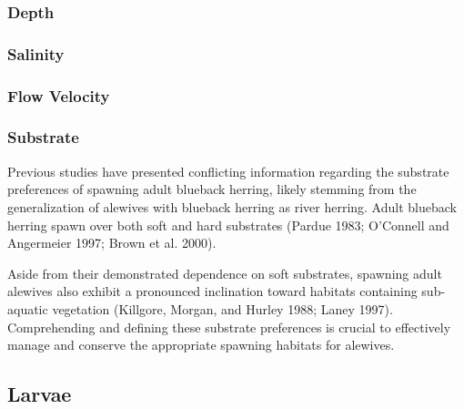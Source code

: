 \documentclass[
]{book}
\begin{document}
\hypertarget{depth-10}{%
\subsubsection{Depth}\label{depth-10}}

\hypertarget{salinity-10}{%
\subsubsection{Salinity}\label{salinity-10}}

\hypertarget{flow-velocity-10}{%
\subsubsection{Flow Velocity}\label{flow-velocity-10}}

\hypertarget{substrate-10}{%
\subsubsection{Substrate}\label{substrate-10}}

Previous studies have presented conflicting information regarding the substrate preferences of spawning adult blueback herring, likely stemming from the generalization of alewives with blueback herring as river herring.
Adult blueback herring spawn over both soft and hard substrates (Pardue 1983; O'Connell and Angermeier 1997; Brown et al. 2000).

Aside from their demonstrated dependence on soft substrates, spawning adult alewives also exhibit a pronounced inclination toward habitats containing sub-aquatic vegetation (Killgore, Morgan, and Hurley 1988; Laney 1997).
Comprehending and defining these substrate preferences is crucial to effectively manage and conserve the appropriate spawning habitats for alewives.

\hypertarget{larvae-1}{%
\subsection{Larvae}\label{larvae-1}}
\end{document}
